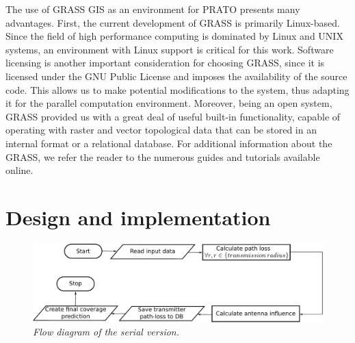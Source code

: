 The use of GRASS GIS as an environment for PRATO presents many advantages.
First, the current development of GRASS is primarily Linux-based.
Since the field of high performance computing is dominated by Linux
and UNIX systems, an environment with Linux support is critical for
this work. Software licensing is another important consideration for
choosing GRASS, since it is licensed under the GNU Public License
\cite{Stallman_GNU_License:1991} and imposes the availability of
the source code. This allows us to make potential modifications to
the system, thus adapting it for the parallel computation environment.
Moreover, being an open system, GRASS provided us with a great deal
of useful built-in functionality, capable of operating with raster
and vector topological data that can be stored in an internal format
or a relational database. For additional information about the GRASS,
we refer the reader to the numerous guides and tutorials available
online.


\section{Design and implementation \label{sec:Design-and-implementation}}

\begin{figure}
\centering

\includegraphics[width=0.67\columnwidth]{04-framework_design_and_implementation/img/serial_implementation_flow_diagram}

\caption{\textit{\emph{Flow diagram of the serial version.}}\textit{\label{fig:serial_version_flow_diagram}}}
\end{figure}


